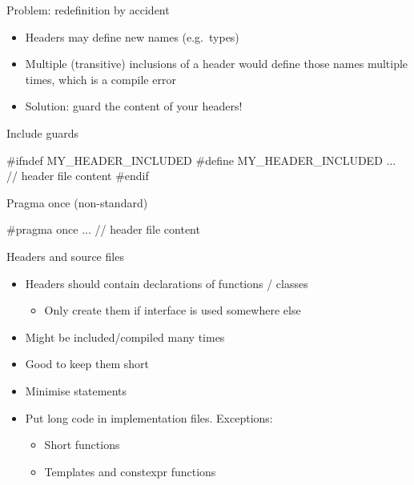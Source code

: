 \begin{frame}[fragile]
  \begin{block}{Problem: redefinition by accident}
    \begin{itemize}
      \item Headers may define new names (e.g.\ types)
      \item Multiple (transitive) inclusions of a header would define those names multiple times, which is a compile error
      \item Solution: guard the content of your headers!
    \end{itemize}
  \end{block}
  \begin{block}{Include guards}
    \begin{cppcode*}{}
      #ifndef MY_HEADER_INCLUDED
      #define MY_HEADER_INCLUDED
      ... // header file content
      #endif
    \end{cppcode*}
  \end{block}
  \begin{block}{Pragma once (non-standard)}
    \begin{cppcode*}{}
      #pragma once
      ... // header file content
    \end{cppcode*}
  \end{block}
\end{frame}

\begin{frame}[fragile]
  \begin{goodpractice}{Headers and source files}
    \begin{itemize}
      \item Headers should contain declarations of functions / classes
        \begin{itemize}
          \item Only create them if interface is used somewhere else
        \end{itemize}
      \item Might be included/compiled many times
      \item Good to keep them short
      \item Minimise  statements
      \item Put long code in implementation files. Exceptions:
        \begin{itemize}
          \item Short functions
          \item Templates and constexpr functions
        \end{itemize}
    \end{itemize}
  \end{goodpractice}
\end{frame}
